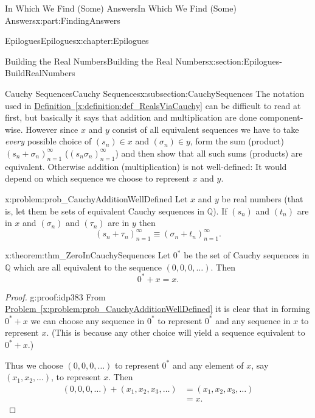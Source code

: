 \documentclass[oneside,10pt,]{book}
\newcommand{\xreffont}{\relax}
\numberwithin{equation}{section}
\newcommand{\RR}{\mathbb {R}}
\newcommand{\QQ}{\mathbb {Q}}
\newcommand{\amp}{&}
\begin{document}
\begin{partptx}{In Which We Find (Some) Answers}{}{In Which We Find (Some) Answers}{}{}{x:part:FindingAnswers}
\begin{chapterptx}{Epilogues}{}{Epilogues}{}{}{x:chapter:Epilogues}
\begin{sectionptx}{Building the Real Numbers}{}{Building the Real Numbers}{}{}{x:section:Epilogues-BuildRealNumbers}
\begin{subsectionptx}{Cauchy Sequences}{}{Cauchy Sequences}{}{}{x:subsection:CauchySequences}
The notation used in \hyperref[x:definition:def_RealsViaCauchy]{Definition~{\xreffont\ref{x:definition:def_RealsViaCauchy}}} can be difficult to read at first, but basically it says that addition and multiplication are done component-wise. However since \(x\) and \(y\) consist of all equivalent sequences we have to take \emph{every} possible choice of \((s_n)\in x\) and \((\sigma_n)\in y\), form the sum (product) \((s_n+\sigma_n)_{n=1}^\infty\) (\((s_n\sigma_n)_{n=1}^\infty\)) and then show that all such sums (products) are equivalent. Otherwise addition (multiplication) is not well-defined: It would depend on which sequence we choose to represent \(x\) and \(y\).%
\begin{problem}{}{x:problem:prob_CauchyAdditionWellDefined}%
\index{\(\RR\)!addition of Cauchy sequences} Let \(x\) and \(y\) be real numbers (that is, let them be sets of equivalent Cauchy sequences  in \(\QQ\)). If \((s_n)\) and \((t_n)\) are in \(x\) and \((\sigma_n)\) and \((\tau_n)\) are in \(y\) then%
\begin{equation*}
(s_n+\tau_n)_{n=1}^\infty \equiv (\sigma_n+t_n)_{n=1}^\infty\text{.}
\end{equation*}
%
\end{problem}
\begin{theorem}{}{}{x:theorem:thm_ZeroInCauchySequences}%
 Let \(0^*\) be the set of Cauchy sequences in \(\QQ\) which are all equivalent to the sequence \((0, 0, 0, \ldots)\). Then%
\begin{equation*}
0^*+x=x\text{.}
\end{equation*}
%
\end{theorem}
\begin{proof}{}{g:proof:idp383}
From \hyperref[x:problem:prob_CauchyAdditionWellDefined]{Problem~{\xreffont\ref{x:problem:prob_CauchyAdditionWellDefined}}} it is clear that in forming \(0^*+x\) we can choose any sequence in \(0^*\) to represent \(0^*\) and any sequence in \(x\) to represent \(x\). (This is because any other choice will yield a sequence equivalent to \(0^*+x\).)%
\par
Thus we choose \((0, 0, 0, \ldots)\) to represent \(0^*\) and any element of \(x\), say \((x_1, x_2, \ldots)\), to represent \(x\). Then%
\begin{align*}
(0, 0, 0, \ldots) + (x_1, x_2, x_3, \ldots) \amp = (x_1, x_2, x_3, \ldots)\\
\amp = x\text{.}
\end{align*}

\end{proof}
\end{subsectionptx}
\end{sectionptx}
\end{chapterptx}
\end{partptx}
\end{document}
